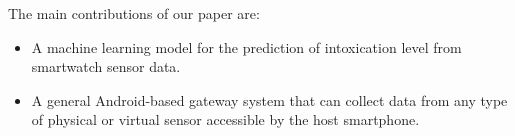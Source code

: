 The main contributions of our paper are: \begin{itemize}
	\item A machine learning model for the prediction of intoxication level from smartwatch sensor data.
	\item A general Android-based gateway system that can collect data from any type of physical or virtual sensor accessible by the host smartphone.
\end{itemize}

